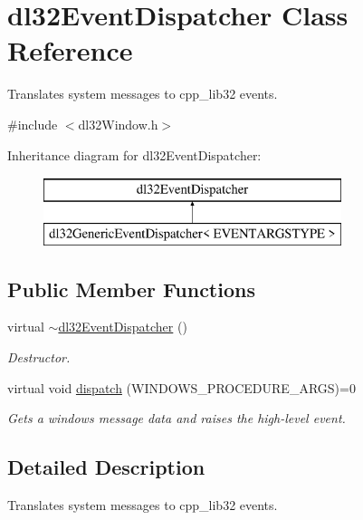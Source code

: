 \hypertarget{classdl32_event_dispatcher}{\section{dl32\-Event\-Dispatcher Class Reference}
\label{classdl32_event_dispatcher}
}


Translates system messages to cpp\-\_\-lib32 events.  




{\ttfamily \#include $<$dl32\-Window.\-h$>$}

Inheritance diagram for dl32\-Event\-Dispatcher\-:\begin{figure}[H]
\begin{center}
\leavevmode
\includegraphics[height=2.000000cm]{classdl32_event_dispatcher}
\end{center}
\end{figure}
\subsection*{Public Member Functions}
\begin{DoxyCompactItemize}
\item 
virtual \hyperlink{classdl32_event_dispatcher_a769a13752ceed22d4a32d36fadc89deb}{$\sim$dl32\-Event\-Dispatcher} ()
\begin{DoxyCompactList}\small\item\em Destructor. \end{DoxyCompactList}\item 
virtual void \hyperlink{classdl32_event_dispatcher_ad77376cf78424c392a53195bfd871ee1}{dispatch} (W\-I\-N\-D\-O\-W\-S\-\_\-\-P\-R\-O\-C\-E\-D\-U\-R\-E\-\_\-\-A\-R\-G\-S)=0
\begin{DoxyCompactList}\small\item\em Gets a windows message data and raises the high-\/level event. \end{DoxyCompactList}\end{DoxyCompactItemize}


\subsection{Detailed Description}
Translates system messages to cpp\-\_\-lib32 events. 

